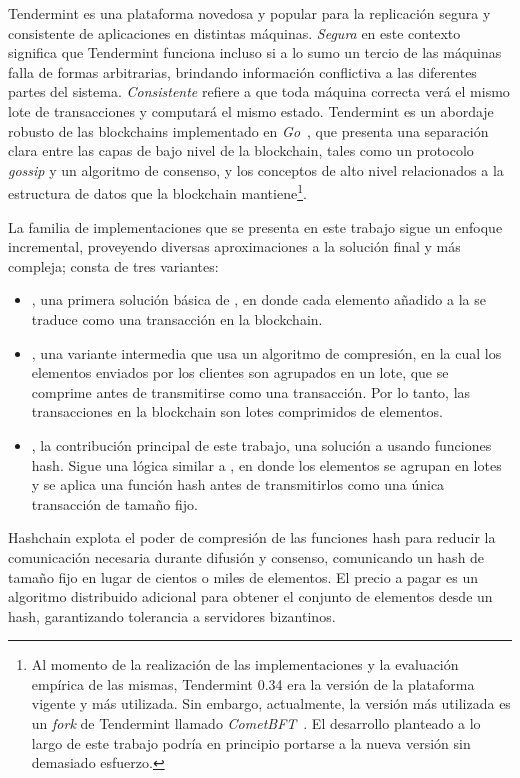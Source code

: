

Tendermint es una plataforma novedosa y popular para la
replicación segura y consistente de aplicaciones en distintas máquinas.
%
\textit{Segura} en este contexto significa que Tendermint funciona incluso si a lo sumo
un tercio de las máquinas falla de formas arbitrarias, brindando información conflictiva
a las diferentes partes del sistema.
%
\textit{Consistente} refiere a que toda máquina correcta verá el mismo lote de
transacciones y computará el mismo estado.
%
Tendermint es un abordaje robusto de las blockchains implementado
en \emph{Go}~\cite{donovan15go}, que presenta una separación clara entre las
capas de bajo nivel de la blockchain,
tales como un protocolo \textit{gossip} y un algoritmo de consenso, y los conceptos de alto
nivel relacionados a la estructura de datos que la blockchain mantiene\footnote{Al momento
de la realización de las implementaciones y la evaluación empírica de las mismas,
Tendermint 0.34 era la versión de la plataforma vigente y más utilizada. Sin embargo,
actualmente, la versión más utilizada es un \textit{fork} de Tendermint llamado \textit{CometBFT}~\cite{cometbft.repo}.
El desarrollo planteado a lo largo de este trabajo podría en principio portarse a la nueva versión sin demasiado esfuerzo.}.

%
%

La familia de implementaciones que se presenta en este trabajo
sigue un enfoque incremental, proveyendo diversas aproximaciones
a la solución final y más compleja; consta de tres variantes:
\begin{itemize}
  \item \textit{\vanilla}, una primera solución básica de \setchain, en donde cada elemento añadido
  a la \setchain se traduce como una transacción en la blockchain.
  \item \textit{\compresschain}, una variante intermedia que usa un algoritmo de compresión,
  en la cual los elementos enviados por los clientes son agrupados en un lote, que se comprime antes
  de transmitirse como una transacción. Por lo tanto, las transacciones en la blockchain son
  lotes comprimidos de elementos.
  \item \textit{\hashchain}, la contribución principal de este trabajo, una solución 
  a \setchain usando funciones hash. Sigue una lógica similar a \compresschain,
  en donde los elementos se agrupan en lotes y se aplica una función hash antes de transmitirlos
  como una única transacción de tamaño fijo.
\end{itemize}
%
Hashchain explota el poder de compresión de las funciones hash para reducir la
comunicación necesaria durante difusión y consenso, comunicando un hash de tamaño
fijo en lugar de cientos o miles de elementos.
%
El precio a pagar es un algoritmo distribuido adicional para obtener el conjunto de
elementos desde un hash, garantizando tolerancia a servidores bizantinos.
%

